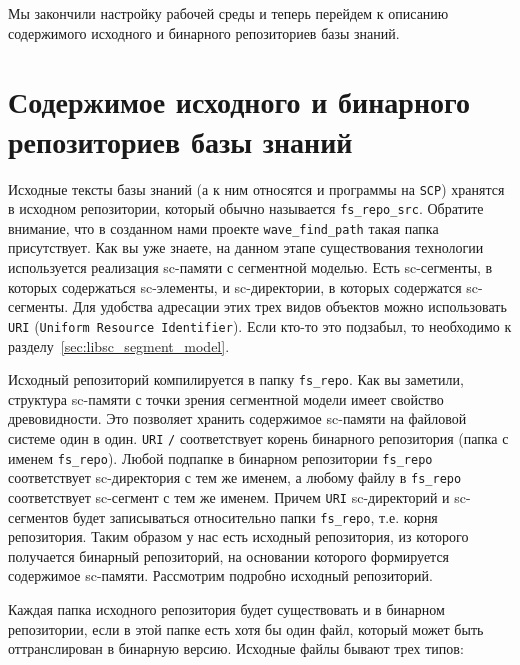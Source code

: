 Мы закончили настройку рабочей среды и теперь перейдем к описанию
содержимого исходного и бинарного репозиториев базы знаний.

\clearpage
\clearpage

\section{Содержимое исходного и бинарного репозиториев базы знаний}
\label{sec:scpalgo_repo}

Исходные тексты базы знаний (а к ним относятся и программы на
\texttt{SCP}) хранятся в исходном репозитории, который обычно
называется \verb|fs_repo_src|. Обратите внимание, что в созданном нами
проекте \verb|wave_find_path| такая папка присутствует. Как вы уже
знаете, на данном этапе существования технологии используется
реализация sc-памяти с сегментной моделью. Есть sc-сегменты, в которых
содержаться sc-элементы, и sc-директории, в которых содержатся
sc-сегменты. Для удобства адресации этих трех видов объектов можно
использовать \texttt{URI} (\texttt{Uniform Resource Identifier}). Если
кто-то это подзабыл, то необходимо к
разделу~\ref{sec:libsc_segment_model}.

Исходный репозиторий компилируется в папку \verb|fs_repo|. Как вы
заметили, структура sc-памяти с точки зрения сегментной модели имеет
свойство древовидности. Это позволяет хранить содержимое sc-памяти на
файловой системе один в один. \texttt{URI} \verb|/| соответствует
корень бинарного репозитория (папка с именем \verb|fs_repo|). Любой
подпапке в бинарном репозитории \verb|fs_repo| соответствует
sc-директория с тем же именем, а любому файлу в \verb|fs_repo|
соответствует sc-сегмент с тем же именем. Причем \texttt{URI}
sc-директорий и sc-сегментов будет записываться относительно папки
\verb|fs_repo|, т.е. корня репозитория. Таким образом у нас есть
исходный репозитория, из которого получается бинарный репозиторий, на
основании которого формируется содержимое sc-памяти. Рассмотрим
подробно исходный репозиторий.

Каждая папка исходного репозитория будет существовать и в бинарном
репозитории, если в этой папке есть хотя бы один файл, который может
быть оттранслирован в бинарную версию. Исходные файлы бывают трех
типов:

